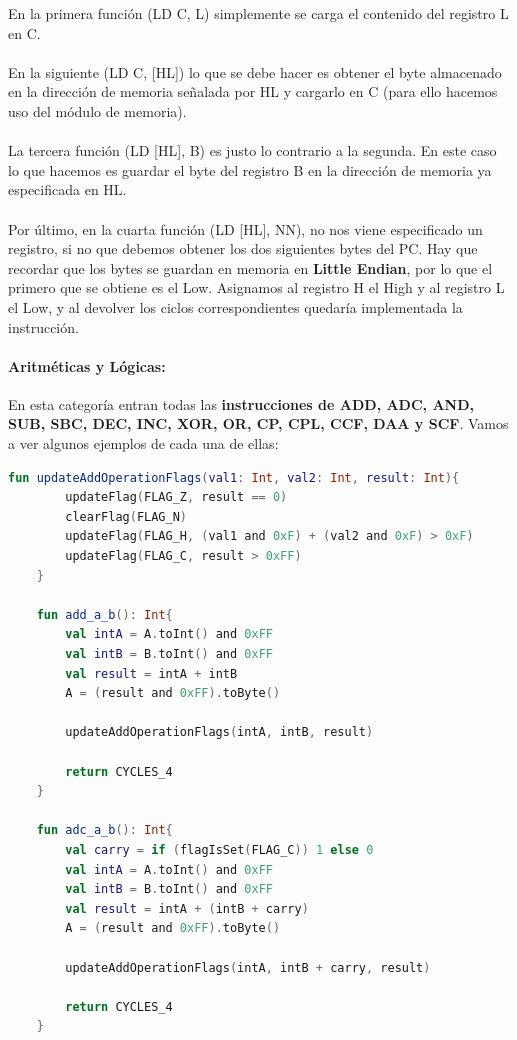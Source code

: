 En la primera función (LD C, L) simplemente se carga el contenido del registro L en C.
\\\\
En la siguiente (LD C, [HL]) lo que se debe hacer es obtener el byte almacenado en la dirección de memoria señalada por HL y cargarlo en C (para ello hacemos uso del módulo de memoria).
\\\\
La tercera función (LD [HL], B) es justo lo contrario a la segunda. En este caso lo que hacemos es guardar el byte del registro B en la dirección de memoria ya especificada en HL.
\\\\
Por último, en la cuarta función (LD [HL], NN), no nos viene especificado un registro, si no que debemos obtener los dos siguientes bytes del PC. Hay que recordar que los bytes se guardan en memoria en \textbf{Little Endian}, por lo que el primero que se obtiene es el Low. Asignamos al registro H el High y al registro L el Low, y al devolver los ciclos correspondientes quedaría implementada la instrucción.

\paragraph{Aritméticas y Lógicas:} En esta categoría entran todas las \textbf{instrucciones de ADD, ADC, AND, SUB, SBC, DEC, INC, XOR, OR, CP, CPL, CCF, DAA y SCF}. Vamos a ver algunos ejemplos de cada una de ellas:

\begin{lstlisting}[language=Kotlin, caption={Operaciones ADD y ADC}, label={code:kotlinaddc}]
    fun updateAddOperationFlags(val1: Int, val2: Int, result: Int){
        updateFlag(FLAG_Z, result == 0)
        clearFlag(FLAG_N)
        updateFlag(FLAG_H, (val1 and 0xF) + (val2 and 0xF) > 0xF)
        updateFlag(FLAG_C, result > 0xFF)
    }

    fun add_a_b(): Int{
        val intA = A.toInt() and 0xFF
        val intB = B.toInt() and 0xFF
        val result = intA + intB
        A = (result and 0xFF).toByte()

        updateAddOperationFlags(intA, intB, result)

        return CYCLES_4
    }

    fun adc_a_b(): Int{
        val carry = if (flagIsSet(FLAG_C)) 1 else 0
        val intA = A.toInt() and 0xFF
        val intB = B.toInt() and 0xFF
        val result = intA + (intB + carry)
        A = (result and 0xFF).toByte()

        updateAddOperationFlags(intA, intB + carry, result)

        return CYCLES_4
    }
\end{lstlisting}

